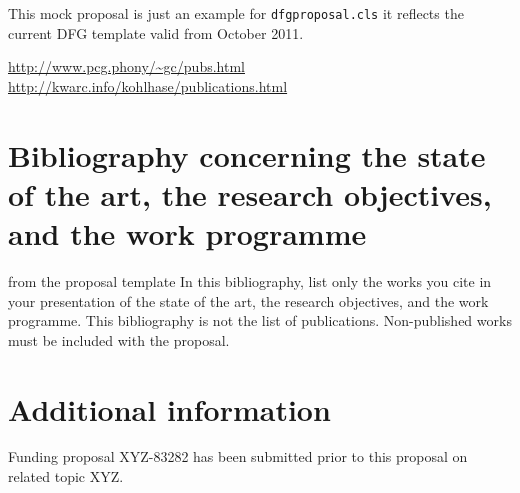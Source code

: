 \documentclass[    %
    gitinfo,       %
    noworkareas,   %
    RAM,           %
    general,       %
    \classoptions] %
    {dfgproposal}
\begin{document}
\begin{center}\color{red}\huge
  This mock proposal is just an example for \texttt{dfgproposal.cls} it reflects the 
  current DFG template valid from October 2011.
\end{center}

\urldef{\gcpubs}\url{http://www.pcg.phony/~gc/pubs.html}
\urldef{\mikopubs}\url{http://kwarc.info/kohlhase/publications.html}
\begin{proposal}[PI=miko,
  pubspage=mikopubs,
  thema=Intelligentes Schreiben von Antr\"agen,
  acronym={iPoWr},
  acrolong={\underline{I}ntelligent} {\underline{P}r\underline{o}posal} {\underline{Wr}iting},
  title=\pn: \protect\pnlong,
  totalduration=3 years,
  since=1. Feb 2009,
  start=1. Feb. 2010,
  months=24,
  RM=36,RAM=36,
  discipline=Computer Science, 
  areas=Knowledge Management]






\section{Bibliography concerning the state of the art, the research objectives, and the
  work programme }

\begin{todo}{from the proposal template}
  In this bibliography, list only the works you cite in your presentation of the state of
  the art, the research objectives, and the work programme. This bibliography is not the
  list of publications. Non-published works must be included with the proposal.
\end{todo}
\printbibliography[heading=empty]
\ifpublic\else


\section{Additional information }

Funding proposal XYZ-83282 has been submitted prior to this proposal on related topic XYZ.
\fi %
\end{proposal}
\end{document}
